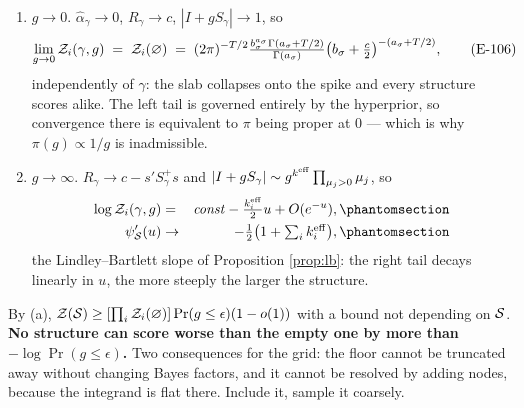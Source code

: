 \begin{proposition}\label{prop:ends}
\begin{enumerate}[label=(\alph*), leftmargin=2em, topsep=0pt, itemsep=0pt]
\item $g\to0$. $\hat\alpha_\gamma\to0$, $R_\gamma\to c$, $|I+gS_\gamma|\to1$, so
\begin{equation}
\lim_{g\to0}\mathcal{Z}_i(\gamma,g) \;=\; \mathcal{Z}_i(\varnothing) \;=\;
(2\pi)^{-T/2}\tfrac{b_\sigma^{a_\sigma}\Gamma(a_\sigma+T/2)}{\Gamma(a_\sigma)}
\bigl(b_\sigma+\tfrac{c}{2}\bigr)^{-(a_\sigma+T/2)},
\tag{E-106}\label{E106}
\end{equation}
independently of $\gamma$: the slab collapses onto the spike and every structure
scores alike. The left tail is governed entirely by the hyperprior, so convergence
there is equivalent to $\pi$ being proper at 0 --- which is why $\pi(g)\propto1/g$ is
inadmissible.
\item $g\to\infty$. $R_\gamma\to c-s'S_\gamma^{+}s$ and
$|I+gS_\gamma|\sim g^{k^{\mathrm{eff}}}\prod_{\mu_j>0}\mu_j$, so
\begin{eqnarray}
\log\Zc_i(\gamma,g) &=& \mathit{const} - \tfrac{k_i^{\eff}}{2}u + O(e^{-u}),
  \Elabel{E-107A}{E107_A} \\
\psi_\Sc'(u) &\to& -\tfrac12\bigl(1+\textstyle\sum_i k_i^{\eff}\bigr),
  \Elabel{E-107B}{E107_B}
\end{eqnarray}
the Lindley--Bartlett slope of Proposition \ref{prop:lb}: the right tail decays
linearly in $u$, the more steeply the larger the structure.
\end{enumerate}
\end{proposition}

\begin{corollary}\label{cor:floor}
By (a),
$\mathcal{Z}(\mathcal{S})\ge[\prod_i\mathcal{Z}_i(\varnothing)]\Pr(g\le\epsilon)(1-o(1))$ with a bound not
depending on $\mathcal{S}$. \textbf{No structure can score worse than the empty one by more
than $-\log\Pr(g\le\epsilon)$.} Two consequences for the grid: the floor cannot be
truncated away without changing Bayes factors, and it cannot be resolved by adding
nodes, because the integrand is flat there. Include it, sample it coarsely.
\end{corollary}

